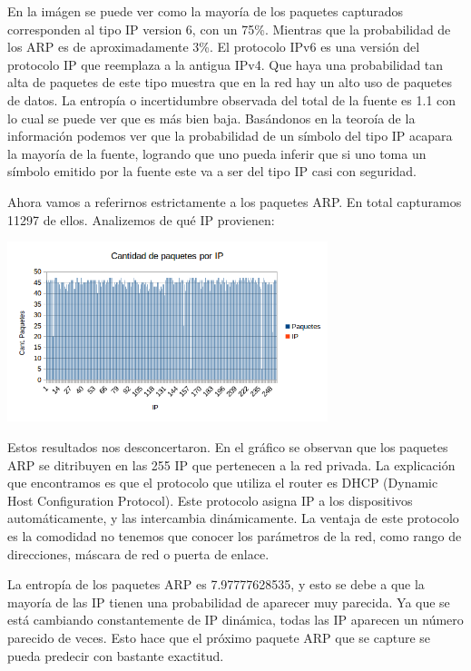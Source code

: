 En la im\'agen se puede ver como la mayor\'ia de los paquetes capturados corresponden al tipo IP version 6, con un 75\%. Mientras que la probabilidad de los ARP es de aproximadamente 3\%. 
El protocolo IPv6 es una versión del protocolo IP que reemplaza a la antigua IPv4. Que haya una probabilidad tan alta de paquetes de este tipo muestra que en la red hay un alto uso de paquetes de datos. 
La entrop\'ia o incertidumbre observada del total de la fuente es 1.1 con lo cual se puede ver que es m\'as bien baja. Bas\'andonos en la teoro\'ia
de la informaci\'on podemos ver que la probabilidad de un s\'imbolo del tipo IP acapara la mayor\'ia de la fuente, logrando que uno pueda inferir que si uno toma un s\'imbolo emitido por la fuente este va a ser del tipo IP casi con seguridad.

Ahora vamos a referirnos estrictamente a los paquetes ARP. En total capturamos 11297 de ellos. Analizemos de qu\'e IP provienen: 

\begin{center}
\includegraphics[width=0.7\textwidth]{exp4-graficos/exp4_2.png}
\end{center}


Estos resultados nos desconcertaron. En el gr\'afico se observan que los paquetes ARP se ditribuyen en las 255 IP que pertenecen a la red privada. La explicaci\'on que encontramos es que el protocolo que utiliza el router es DHCP (Dynamic Host Configuration Protocol). Este protocolo asigna IP a los dispositivos autom\'aticamente, y las intercambia din\'amicamente. La ventaja de este protocolo es la comodidad no tenemos que conocer los par\'ametros de la red, como rango de direcciones, m\'ascara de red o puerta de enlace. 

La entropía de los paquetes ARP es 7.97777628535, y esto se debe a que la mayoría de las IP tienen una probabilidad de aparecer muy parecida. Ya que se está cambiando constantemente de IP dinámica, todas las IP aparecen un número parecido de veces. Esto hace que el próximo paquete ARP que se capture se pueda predecir con bastante exactitud. 







